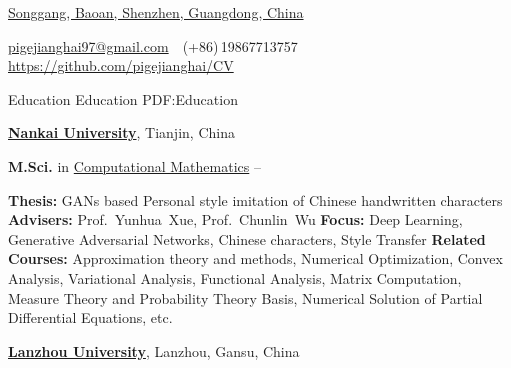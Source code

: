 \documentclass[a4paper,MMMyyyy,nonstopmode]{simpleresumecv}
\newcommand{\CVAuthor}{Hai Jiang}
\newcommand{\CVWebpage}{https://github.com/pigejianghai/CV}
\begin{document}

\Title{\CVAuthor}

\begin{SubTitle}
\href{https://maps.app.goo.gl/6AtFeAEmJWizDJCKA}
{Songgang, Baoan, Shenzhen, Guangdong, China}
\par
\href{mailto:pigejianghai97@gmail.com}
{pigejianghai97@gmail.com}
\,\SubBulletSymbol\,
(+86)\,19867713757
\,\SubBulletSymbol\,
\href{\CVWebpage}
{\url{\CVWebpage}}
\end{SubTitle}

\begin{Body}


\Section
{{\large Education}}
{{\large Education}}
{PDF:Education}

\Entry
\href{https://www.nankai.edu.cn/main.htm}
{\textbf{Nankai University}},
Tianjin, China

\Gap
\BulletItem
\textbf{M.Sci.} in
\href{https://math.nankai.edu.cn/main.htm}
{Computational Mathematics}
\hfill
{} --
\begin{Detail}
    \SubBulletItem
    \textbf{Thesis:}
    GANs based Personal style imitation of Chinese handwritten characters
    \SubBulletItem
    \textbf{Advisers:}
    Prof.~Yunhua~Xue, Prof.~Chunlin~Wu
    \SubBulletItem
    \textbf{Focus:}
    Deep Learning, Generative Adversarial Networks, Chinese characters, Style Transfer
    \SubBulletItem
    \textbf{Related Courses:}
    Approximation theory and methods, Numerical Optimization, Convex Analysis, Variational Analysis, Functional Analysis, 
    Matrix Computation, Measure Theory and Probability Theory Basis, Numerical Solution of Partial Differential Equations, etc.
\end{Detail}



\BigGap
\Entry
\href{https://www.lzu.edu.cn/}
{\textbf{Lanzhou University}},
Lanzhou, Gansu, China


\end{Body}
\end{document}
